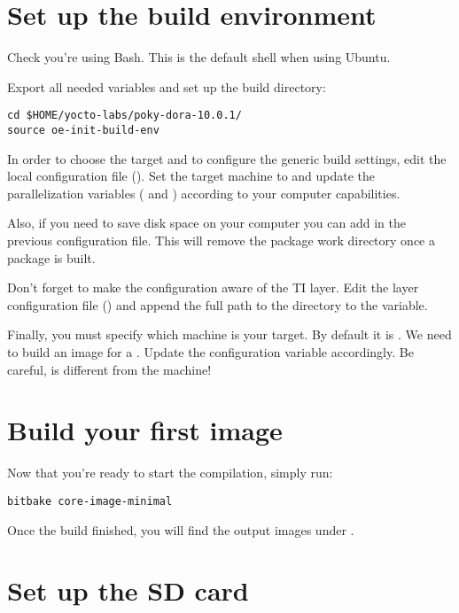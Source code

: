 \section{Set up the build environment}

Check you're using Bash. This is the default shell when using Ubuntu.

Export all needed variables and set up the build directory:
\begin{verbatim}
cd $HOME/yocto-labs/poky-dora-10.0.1/
source oe-init-build-env
\end{verbatim}

In order to choose the target and to configure the generic build settings,
edit the local configuration file (). Set
the target machine to  and update the parallelization variables
( and ) according to your computer
capabilities.

Also, if you need to save disk space on your computer you can add  in the previous configuration file. This will remove the
package work directory once a package is built.

Don't forget to make the configuration aware of the TI layer. Edit the
layer configuration file () and append the
full path to the  directory to the  variable.

Finally, you must specify which machine is your target. By default it
is . We need to build an image for a .
Update the  configuration variable accordingly. Be
careful,  is different from the 
machine!

\section{Build your first image}

Now that you're ready to start the compilation, simply run:
\begin{verbatim}
bitbake core-image-minimal
\end{verbatim}

Once the build finished, you will find the output images under
.

\section{Set up the SD card}

